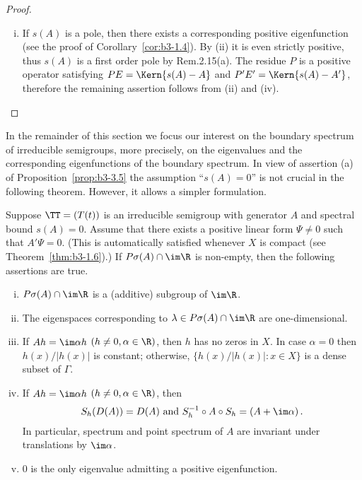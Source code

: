\begin{proof}
\begin{enumerate}[(i), wide]
	\item 
	If $s(A)$ is a pole, then there exists a corresponding positive eigenfunction (see the proof of Corollary~\ref{cor:b3-1.4}).
	By (ii) it is even strictly positive, thus $s(A)$ is a first order pole by Rem.2.15(a).
	The residue $P$ is a positive operator satisfying $PE = \Kern{s(A) - A}$ and $P'E' = \Kern{s(A) - A'}$, therefore the remaining assertion follows from (ii) and (iv).
	\end{enumerate}
	\end{proof}

In the remainder of this section we focus our interest on the boundary spectrum of irreducible semigroups, more precisely, on the eigenvalues and the corresponding eigenfunctions of the boundary spectrum. In view of assertion (a) of Proposition~\ref{prop:b3-3.5} the assumption \enquote{$s(A) = 0$} is not crucial in the following theorem. However, it allows a simpler formulation. 
%
\begin{theorem}\label{thm:b3-3.6}
	Suppose $\TT = (T(t))$ is an irreducible semigroup with generator $A$ and spectral bound $s(A) = 0$.
	Assume that there exists a positive linear form $\Psi \neq 0$ such that $A'\Psi = 0$. (This is automatically satisfied whenever $X$ is compact (see Theorem~\ref{thm:b3-1.6}).)
	If $P\sigma(A)\cap \im\R$ is non-empty, then the following assertions are true.
	\begin{enumerate}[(i)]
		\item 
		$P\sigma(A)\cap \im\R$ is a (additive) subgroup of $\im \R$.
	
		\item 
		The eigenspaces corresponding to $\lambda \in P\sigma(A)\cap \im\R$ are one-dimensional.
	
		\item 
		If $Ah = \im\alpha h$ $(h \neq 0, \alpha \in \R)$, then $h$ has no zeros in $X$.
		In case $\alpha = 0$ then $h(x)/|h(x)|$ is constant; otherwise, $\{h(x)/|h(x)| : x \in X\}$ is a dense subset of $\Gamma$.
	
		\item 
		If $Ah = \im\alpha h$ $(h \neq 0, \alpha \in \R)$, then
		\begin{equation}\label{eq:b3-3.5}
			S_{h}(D(A)) = D(A) \text{ and } S_{h}^{-1}\circ A \circ S_{h} = (A + \im\alpha)\,.
		\end{equation}
		In particular, spectrum and point spectrum of $A$ are invariant under translations by $\im \alpha$.
	
		\item 
		$0$ is the only eigenvalue admitting a positive eigenfunction.
	\end{enumerate}
\end{theorem}

